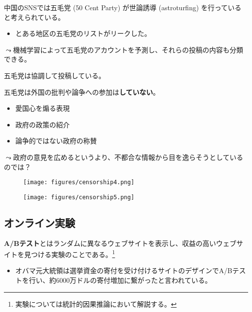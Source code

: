 \documentclass[
  xelatex,
  ja=standard]{bxjsarticle}
\providecommand{\tightlist}{%
  \setlength{\itemsep}{0pt}\setlength{\parskip}{0pt}}\usepackage{longtable,booktabs,array}
\begin{document}
中国のSNSでは五毛党 (50 Cent Party) が世論誘導 (astroturfing)
を行っていると考えられている。

\begin{itemize}
\tightlist
\item
  とある地区の五毛党のリストがリークした。
\end{itemize}

\(\leadsto\)機械学習によって五毛党のアカウントを予測し、それらの投稿の内容も分類できる。

五毛党は協調して投稿している。

五毛党は外国の批判や論争への参加は\textbf{していない}。

\begin{itemize}
\tightlist
\item
  愛国心を煽る表現
\item
  政府の政策の紹介
\item
  論争的ではない政府の称賛
\end{itemize}

\(\leadsto\)政府の意見を広めるというより、不都合な情報から目を逸らそうとしているのでは？

\begin{figure}[htpb]

{\centering \texttt{[image: figures/censorship4.png]}

}

\caption{\citet{king2017}}

\end{figure}

\begin{figure}[htpb]

{\centering \texttt{[image: figures/censorship5.png]}

}

\caption{\citet{king2017}}

\end{figure}

\hypertarget{ux30aaux30f3ux30e9ux30a4ux30f3ux5b9fux9a13}{%
\subsection{オンライン実験}\label{ux30aaux30f3ux30e9ux30a4ux30f3ux5b9fux9a13}}

\textbf{A/Bテスト}とはランダムに異なるウェブサイトを表示し、収益の高いウェブサイトを見つける実験のことである。\footnote{実験については統計的因果推論において解説する。}

\begin{itemize}
\tightlist
\item
  オバマ元大統領は選挙資金の寄付を受け付けるサイトのデザインでA/Bテストを行い、約6000万ドルの寄付増加に繋がったと言われている。
\end{itemize}
\end{document}
